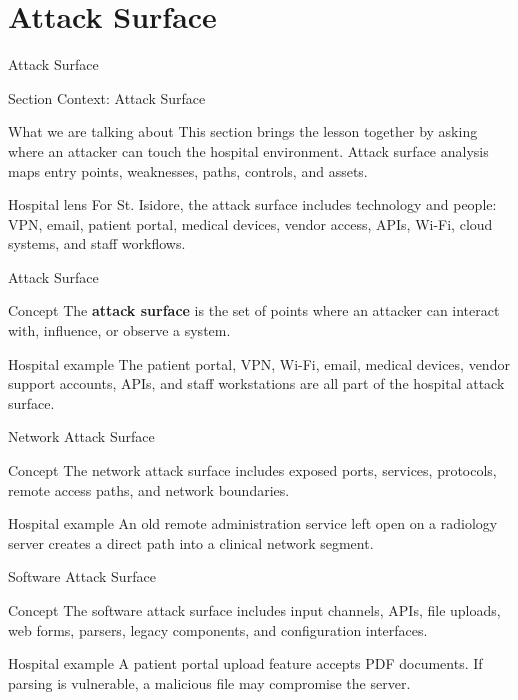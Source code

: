 \documentclass[presentation]{beamer}
\newcommand{\sectiontitleframe}[1]{
\begin{frame}[plain,c]
\begin{center}
{\usebeamerfont{title}\usebeamercolor[fg]{title}#1}
\end{center}
\end{frame}
}
\begin{document}
\section{Attack Surface}
\sectiontitleframe{Attack Surface}

\begin{frame}[c]{Section Context: Attack Surface}
\begin{block}{What we are talking about}
This section brings the lesson together by asking where an attacker can touch the hospital
environment. Attack surface analysis maps entry points, weaknesses, paths, controls, and assets.
\end{block}

\begin{exampleblock}{Hospital lens}
For St. Isidore, the attack surface includes technology and people: VPN, email, patient portal,
medical devices, vendor access, APIs, Wi-Fi, cloud systems, and staff workflows.
\end{exampleblock}
\end{frame}

\begin{frame}[c]{Attack Surface}
\begin{block}{Concept}
The \textbf{attack surface} is the set of points where an attacker can interact with, influence, or
observe a system.
\end{block}

\begin{exampleblock}{Hospital example}
The patient portal, VPN, Wi-Fi, email, medical devices, vendor support accounts, APIs, and staff
workstations are all part of the hospital attack surface.
\end{exampleblock}
\end{frame}

\begin{frame}[c]{Network Attack Surface}
\begin{block}{Concept}
The network attack surface includes exposed ports, services, protocols, remote access paths, and
network boundaries.
\end{block}

\begin{exampleblock}{Hospital example}
An old remote administration service left open on a radiology server creates a direct path into a
clinical network segment.
\end{exampleblock}
\end{frame}

\begin{frame}[c]{Software Attack Surface}
\begin{block}{Concept}
The software attack surface includes input channels, APIs, file uploads, web forms, parsers,
legacy components, and configuration interfaces.
\end{block}

\begin{exampleblock}{Hospital example}
A patient portal upload feature accepts PDF documents. If parsing is vulnerable, a malicious file
may compromise the server.
\end{exampleblock}
\end{frame}
\end{document}

